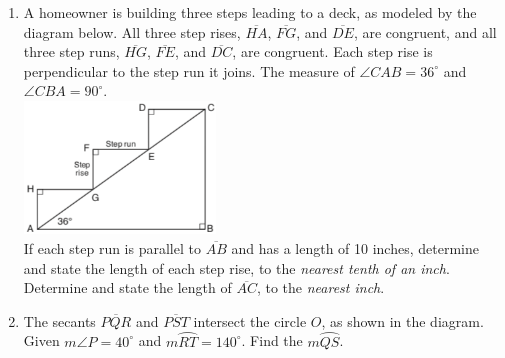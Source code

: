 \documentclass[12pt, twoside]{article}
\begin{document}
\begin{enumerate}
   \item A homeowner is building three steps leading to a deck, as modeled by the diagram below. All three step rises, $\overline{HA}$,  $\overline{FG}$, and  $\overline{DE}$, are congruent, and all three step runs, $\overline{HG}$,  $\overline{FE}$, and  $\overline{DC}$, are congruent. Each step rise is perpendicular to the step run it joins. The measure of $\angle CAB = 36^\circ$ and $\angle CBA = 90^\circ$.\\[0.5cm]
     \includegraphics[width=0.4\textwidth]{steps_Aug2018-33.png}\\
   If each step run is parallel to $\overline{AB}$ and has a length of 10 inches, determine and state the length of each step rise, to the \emph{nearest tenth of an inch}.\\[3cm]
   Determine and state the length of $\overline{AC}$, to the \emph{nearest inch}.

   \item The secants $\overline{PQR}$ and $\overline{PST}$ intersect the circle $O$, as shown in the diagram. \\Given $m \angle P=40^\circ$ and $m \wideparen{RT}=140^\circ$. Find the $m\wideparen{QS}$.
        \begin{center}
      \end{center} \vspace{1cm}


\end{enumerate}
\end{document}
